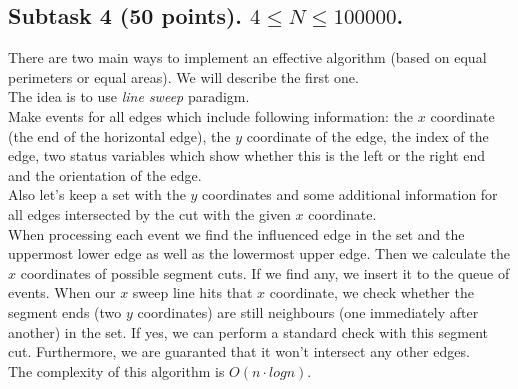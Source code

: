\documentclass[a4paper,12pt]{article}
\begin{document}
\subsection*{Subtask 4 (50 points). $4 \le N \le 100 000$.}
There are two main ways to implement an effective algorithm (based on equal perimeters or equal areas). We will describe the first one.
\\The idea is to use \textit{line sweep} paradigm.
\\Make events for all edges which include following information: the $x$ coordinate (the end of the horizontal edge), the $y$ coordinate of the edge,
the index of the edge, two status variables which show whether this is the left or the right end and the orientation of the edge.
\\Also let's keep a set with the $y$ coordinates and some additional information for all edges intersected by the cut with the given $x$ coordinate.
\\When processing each event we find the influenced edge in the set and the uppermost lower edge as well as the lowermost upper edge. Then we calculate
the $x$ coordinates of possible segment cuts. If we find any, we insert it to the queue of events. When our $x$ sweep line hits that $x$ coordinate, we check 
whether the segment ends (two $y$ coordinates) are still neighbours (one immediately after another) in the set. If yes, we can perform a standard check with
this segment cut. Furthermore, we are guaranted that it won't intersect any other edges.
\\The complexity of this algorithm is $O(n \cdot log n)$.
\end{document}
